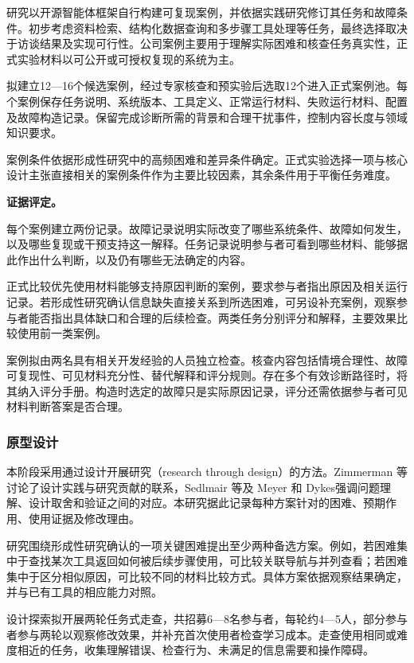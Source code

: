 研究以开源智能体框架自行构建可复现案例，并依据实践研究修订其任务和故障条件。初步考虑资料检索、结构化数据查询和多步骤工具处理等任务，最终选择取决于访谈结果及实现可行性。公司案例主要用于理解实际困难和核查任务真实性，正式实验材料以可公开或可授权复现的系统为主。

拟建立12—16个候选案例，经过专家核查和预实验后选取12个进入正式案例池。每个案例保存任务说明、系统版本、工具定义、正常运行材料、失败运行材料、配置及故障构造记录。保留完成诊断所需的背景和合理干扰事件，控制内容长度与领域知识要求。

案例条件依据形成性研究中的高频困难和差异条件确定。正式实验选择一项与核心设计主张直接相关的案例条件作为主要比较因素，其余条件用于平衡任务难度。

\noindent\textbf{证据评定。}

每个案例建立两份记录。故障记录说明实际改变了哪些系统条件、故障如何发生，以及哪些复现或干预支持这一解释。任务记录说明参与者可看到哪些材料、能够据此作出什么判断，以及仍有哪些无法确定的内容。

正式比较优先使用材料能够支持原因判断的案例，要求参与者指出原因及相关运行记录。若形成性研究确认信息缺失直接关系到所选困难，可另设补充案例，观察参与者能否指出具体缺口和合理的后续检查。两类任务分别评分和解释，主要效果比较使用前一类案例。

案例拟由两名具有相关开发经验的人员独立检查。核查内容包括情境合理性、故障可复现性、可见材料充分性、替代解释和评分规则。存在多个有效诊断路径时，将其纳入评分手册。构造时选定的故障只是实际原因记录，评分还需依据参与者可见材料判断答案是否合理。

\subsubsection{原型设计}

本阶段采用通过设计开展研究（research through design）的方法。Zimmerman 等\cite{zimmerman2007rtd}讨论了设计实践与研究贡献的联系，Sedlmair 等\cite{sedlmair2012design}及 Meyer 和 Dykes\cite{meyer2020rigor}强调问题理解、设计取舍和验证之间的对应。本研究据此记录每种方案针对的困难、预期作用、使用证据及修改理由。

研究围绕形成性研究确认的一项关键困难提出至少两种备选方案。例如，若困难集中于查找某次工具返回如何被后续步骤使用，可比较关联导航与并列查看；若困难集中于区分相似原因，可比较不同的材料比较方式。具体方案依据观察结果确定，并与已有工具的相应能力对照。

设计探索拟开展两轮任务式走查，共招募6—8名参与者，每轮约4—5人，部分参与者参与两轮以观察修改效果，并补充首次使用者检查学习成本。走查使用相同或难度相近的任务，收集理解错误、检查行为、未满足的信息需要和操作障碍。


